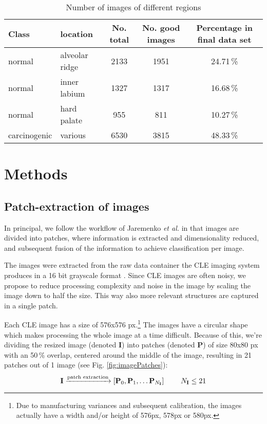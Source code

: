 \documentclass[fleqn,10pt]{wlscirep}
\begin{document}
\begin{table*}\centering\begin{tabular}{l|l|c|c|c}
  Class & location & No. total & No. good images & Percentage in final data set  \\
  \hline
  normal & alveolar ridge & 2133 & 1951 & 24.71\,\%\\
  normal & inner labium & 1327 & 1317 & 16.68\,\% \\
  normal & hard palate & 955 & 811 & 10.27\,\% \\
  carcinogenic & various & 6530 & 3815 & 48.33\,\% \\
\end{tabular}
\caption{Number of images of different regions}
\label{tab:locations}
\end{table*}


\section{Methods}


\subsection{Patch-extraction of images}

In principal, we follow the workflow of Jaremenko \textit{et al.} \cite{Jaremenko:2015kh} in that images are divided into patches, where information is extracted and dimensionality reduced, and subsequent fusion of the information to achieve classification per image.

The images were extracted from the raw data container the CLE imaging
system produces in a 16 bit grayscale format \cite{Aubreville:2016}.
Since CLE images are often noisy, we propose to reduce processing complexity and noise in the image by scaling the image down to half the size. This way also more relevant structures are captured in a single patch.

Each CLE image has a size of 576x576 px.\footnote{Due to
  manufacturing variances and subsequent calibration, the images
  actually have a width and/or height of 576px, 578px or 580px.}
The images have a circular shape which makes processing the whole
image at a time difficult. Because of this, we're dividing the resized
image (denoted $\textbf{I}$)  into
patches (denoted $\textbf{P}$) of size 80x80 px with an 50\,\% overlap, centered
around the middle of the image, resulting in 21
patches out of 1 image (see Fig. \ref{fig:imagePatches}):
\begin{equation}
 \textbf{I} \xrightarrow{\textrm{patch extraction}} \left[{
    \textbf{P}_0, \textbf{P}_1, \dots \textbf{P}_{N_\textbf{I}}}
    \right] \hspace{0.3in} N_\textbf{I} \leq 21
\end{equation}
\end{document}
